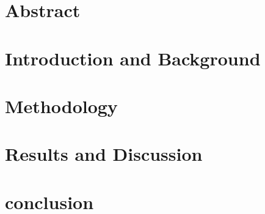 \documentclass[10pt]{article}
\begin{document}
    
    \section{Abstract}
    
    
    \section{Introduction and Background}
    
    
    \section{Methodology}
    
    
    \section{Results and Discussion}
    
    
    \section{conclusion}
    
    
    \pagebreak
    \small
    {}
    
\end{document}
